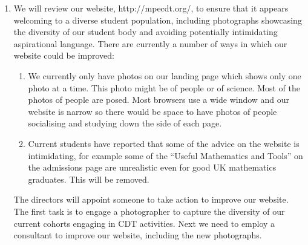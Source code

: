 \documentclass[12pt]{article}
\begin{document}
\begin{enumerate}
\item We will review our website, http://mpecdt.org/, to ensure that it appears welcoming to a diverse student population, including photographs showcasing the diversity of our student body and avoiding potentially intimidating aspirational language. There are currently a number of ways in which our website could be improved:

\begin{enumerate}
\item We currently only have photos on our landing page which shows only one photo at a time. This photo might be of people or of science. Most of the photos of people are posed. Most browsers use a wide window and our website is narrow so there would be space to have photos of people socialising and studying down the side of each page.

\item Current students have reported that some of the advice on the website is intimidating, for example some of the ``Useful Mathematics and Tools'' on the admissions page are unrealistic even for good UK mathematics graduates. This will be removed.

\end{enumerate}

The directors will appoint someone to take action to improve our website. The first task is to engage a photographer to capture the diversity of our current cohorts engaging in CDT activities. Next we need to employ a consultant to improve our website, including the new photographs. 


\end{enumerate}
\end{document}
